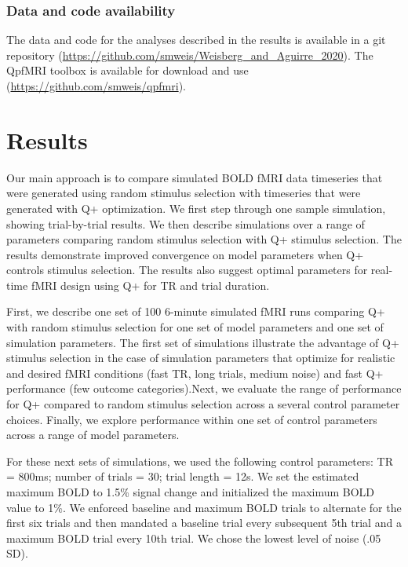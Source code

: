 \documentclass[
  english,
  man,floatsintext]{apa6}
\begin{document}
\hypertarget{data-and-code-availability}{%
\subsubsection{Data and code availability}\label{data-and-code-availability}}

The data and code for the analyses described in the results is available in a git repository (\url{https://github.com/smweis/Weisberg_and_Aguirre_2020}). The QpfMRI toolbox is available for download and use (\url{https://github.com/smweis/qpfmri}).

\hypertarget{results}{%
\section{Results}\label{results}}

Our main approach is to compare simulated BOLD fMRI data timeseries that were generated using random stimulus selection with timeseries that were generated with Q+ optimization. We first step through one sample simulation, showing trial-by-trial results. We then describe simulations over a range of parameters comparing random stimulus selection with Q+ stimulus selection. The results demonstrate improved convergence on model parameters when Q+ controls stimulus selection. The results also suggest optimal parameters for real-time fMRI design using Q+ for TR and trial duration.

First, we describe one set of 100 6-minute simulated fMRI runs comparing Q+ with random stimulus selection for one set of model parameters and one set of simulation parameters. The first set of simulations illustrate the advantage of Q+ stimulus selection in the case of simulation parameters that optimize for realistic and desired fMRI conditions (fast TR, long trials, medium noise) and fast Q+ performance (few outcome categories).Next, we evaluate the range of performance for Q+ compared to random stimulus selection across a several control parameter choices. Finally, we explore performance within one set of control parameters across a range of model parameters.

For these next sets of simulations, we used the following control parameters: TR = 800ms; number of trials = 30; trial length = 12s. We set the estimated maximum BOLD to 1.5\% signal change and initialized the maximum BOLD value to 1\%. We enforced baseline and maximum BOLD trials to alternate for the first six trials and then mandated a baseline trial every subsequent 5th trial and a maximum BOLD trial every 10th trial. We chose the lowest level of noise (.05 SD).
\end{document}
